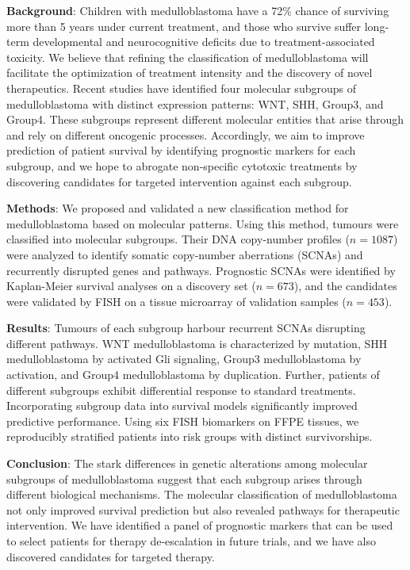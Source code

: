 \textbf{Background}: Children with medulloblastoma have a 72\% chance of surviving more than 5 years under current treatment, and those who survive suffer long-term developmental and neurocognitive deficits due to treatment-associated toxicity. We believe that refining the classification of medulloblastoma will facilitate the optimization of treatment intensity and the discovery of novel therapeutics. Recent studies have identified four molecular subgroups of medulloblastoma with distinct expression patterns: WNT, SHH, Group3, and Group4. These subgroups represent different molecular entities that arise through and rely on different oncogenic processes. Accordingly, we aim to improve prediction of patient survival by identifying prognostic markers for each subgroup, and we hope to abrogate non-specific cytotoxic treatments by discovering candidates for targeted intervention against each subgroup.

\textbf{Methods}: We proposed and validated a new classification method for medulloblastoma based on molecular patterns. Using this method, tumours were classified into molecular subgroups. Their DNA copy-number profiles ($n=1087$) were analyzed to identify somatic copy-number aberrations (SCNAs) and recurrently disrupted genes and pathways. Prognostic SCNAs were identified by Kaplan-Meier survival analyses on a discovery set ($n=673$), and the candidates were validated by FISH on a tissue microarray of validation samples ($n=453$).

\textbf{Results}: Tumours of each subgroup harbour recurrent SCNAs disrupting different pathways. WNT medulloblastoma is characterized by  mutation, SHH medulloblastoma by activated Gli signaling, Group3 medulloblastoma by  activation, and Group4 medulloblastoma by  duplication. Further, patients of different subgroups exhibit differential response to standard treatments. Incorporating subgroup data into survival models significantly improved predictive performance. Using six FISH biomarkers on FFPE tissues, we reproducibly stratified patients into risk groups with distinct survivorships.

\textbf{Conclusion}: The stark differences in genetic alterations among molecular subgroups of medulloblastoma suggest that each subgroup arises through different biological mechanisms. The molecular classification of medulloblastoma not only improved survival prediction but also revealed pathways for therapeutic intervention. We have identified a panel of prognostic markers that can be used to select patients for therapy de-escalation in future trials, and we have also discovered candidates for targeted therapy.
